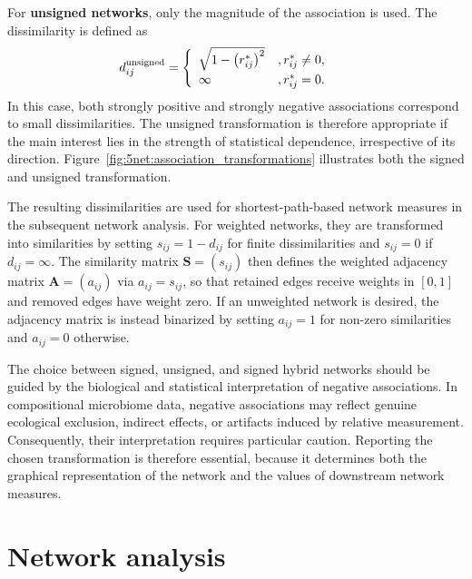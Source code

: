 For \textbf{unsigned networks}, only the magnitude of the association is used. The dissimilarity is defined as
\begin{equation}
\label{eq:5net:net_construct:unsigned_dissimilarity}
d_{ij}^{\mathrm{unsigned}} =
\begin{cases}
\begin{array}{ll@{\quad}l}
\sqrt{1 - \left(r_{ij}^{*}\right)^2} &, r_{ij}^{*} \neq 0,\\
\infty &, r_{ij}^{*} = 0.
\end{array}
\end{cases}
\end{equation}
In this case, both strongly positive and strongly negative associations correspond to small dissimilarities. The unsigned transformation is therefore appropriate if the main interest lies in the strength of statistical dependence, irrespective of its direction. Figure~\ref{fig:5net:association_transformations} illustrates both the signed and unsigned transformation.



The resulting dissimilarities are used for shortest-path-based network measures in the subsequent network analysis. For weighted networks, they are transformed into similarities by setting $s_{ij}=1-d_{ij}$ for finite dissimilarities and $s_{ij}=0$ if $d_{ij}=\infty$. The similarity matrix $\mathbf{S}=(s_{ij})$ then defines the weighted adjacency matrix $\mathbf{A}=(a_{ij})$ via $a_{ij}=s_{ij}$, so that retained edges receive weights in $[0,1]$ and removed edges have weight zero. If an unweighted network is desired, the adjacency matrix is instead binarized by setting $a_{ij}=1$ for non-zero similarities and $a_{ij}=0$ otherwise.

The choice between signed, unsigned, and signed hybrid networks should be guided by the biological and statistical interpretation of negative associations. In compositional microbiome data, negative associations may reflect genuine ecological exclusion, indirect effects, or artifacts induced by relative measurement. Consequently, their interpretation requires particular caution. Reporting the chosen transformation is therefore essential, because it determines both the graphical representation of the network and the values of downstream network measures.

\section{Network analysis}
\label{sec:5net:net_analysis}

